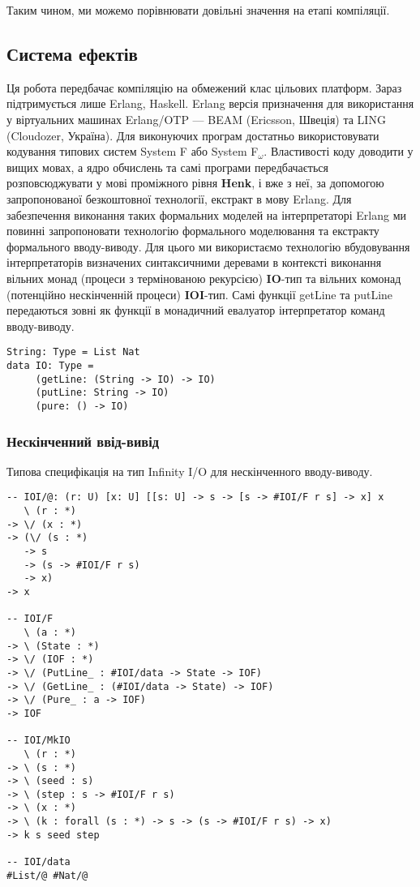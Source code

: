 \documentclass{article}
\begin{document}
Таким чином, ми можемо порівнювати довільні значення на етапі компіляції.

\subsection{Система ефектів}
Ця робота передбачає компіляцію на обмежений клас цільових платформ.
Зараз підтримується лише Erlang, Haskell. Erlang версія призначення для використання у віртуальних
машинах Erlang/OTP — BEAM (Ericsson, Швеція) та LING (Cloudozer, Україна).
Для виконуючих програм достатньо використовувати кодування типових систем System F або System F$_\omega$.
Властивості коду доводити у вищих мовах, а ядро обчислень та самі програми передбачається розповсюджувати
у мові проміжного рівня \textbf{Henk}, і вже з неї, за допомогою запропонованої безкоштовної
технології, екстракт в мову Erlang. Для забезпечення виконання таких формальних моделей на інтерпретаторі Erlang
ми повинні запропоновати технологію формального моделювання та екстракту формального вводу-виводу.
Для цього ми використаємо технологію вбудовування інтерпретаторів визначених синтаксичними деревами в контексті виконання
вільних монад (процеси з термінованою рекурсією) \textbf{IO}-тип та вільних комонад (потенційно нескінченній процеси) \textbf{IOI}-тип.
Самі функції getLine та putLine передаються зовні як функції в монадичний евалуатор інтерпретатор команд вводу-виводу.

\begin{lstlisting}
String: Type = List Nat
data IO: Type =
     (getLine: (String -> IO) -> IO)
     (putLine: String -> IO)
     (pure: () -> IO)
\end{lstlisting}

\subsubsection{Нескінченний ввід-вивід}

Типова специфікація на тип Infinity I/O для нескінченного вводу-виводу.

\begin{lstlisting}
-- IOI/@: (r: U) [x: U] [[s: U] -> s -> [s -> #IOI/F r s] -> x] x
   \ (r : *)
-> \/ (x : *)
-> (\/ (s : *)
   -> s
   -> (s -> #IOI/F r s)
   -> x)
-> x

-- IOI/F
   \ (a : *)
-> \ (State : *)
-> \/ (IOF : *)
-> \/ (PutLine_ : #IOI/data -> State -> IOF)
-> \/ (GetLine_ : (#IOI/data -> State) -> IOF)
-> \/ (Pure_ : a -> IOF)
-> IOF

-- IOI/MkIO
   \ (r : *)
-> \ (s : *)
-> \ (seed : s)
-> \ (step : s -> #IOI/F r s)
-> \ (x : *)
-> \ (k : forall (s : *) -> s -> (s -> #IOI/F r s) -> x)
-> k s seed step

-- IOI/data
#List/@ #Nat/@
\end{lstlisting}
\end{document}
